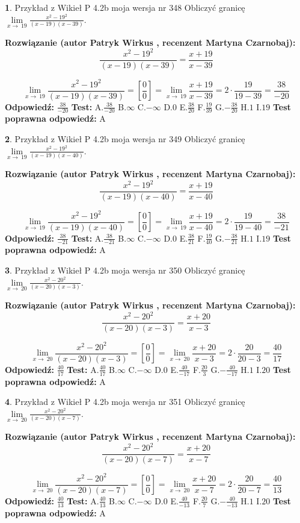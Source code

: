 \documentclass[12pt, a4paper]{article}
\theoremstyle{definition} %
\newtheorem{zad}{}
\newcommand{\zadStart}[1]{\begin{zad}#1\newline}
\newcommand{\zadStop}{\end{zad}}
\newcommand{\rozwStart}[2]{\noindent \textbf{Rozwiązanie (autor #1 , recenzent #2): }\newline}
\newcommand{\rozwStop}{\newline}
\newcommand{\odpStart}{\noindent \textbf{Odpowiedź:}\newline}
\newcommand{\odpStop}{\newline}
\newcommand{\testStart}{\noindent \textbf{Test:}\newline}
\newcommand{\testStop}{\newline}
\newcommand{\kluczStart}{\noindent \textbf{Test poprawna odpowiedź:}\newline}
\newcommand{\kluczStop}{\newline}
\begin{document}
\zadStart{Przykład z Wikieł P 4.2b moja wersja nr 348}
Obliczyć granicę $\lim\limits_{x\to\ 19}\frac{x^{2}-19^{2}}{(x-19)(x-39)}$.
\zadStop
\rozwStart{Patryk Wirkus}{Martyna Czarnobaj}
$$\frac{x^{2}-19^{2}}{(x-19)(x-39)}=\frac{x+19}{x-39}$$

$$\lim\limits_{x\to\ 19}\frac{x^{2}-19^{2}}{(x-19)(x-39)}=[\frac{0}{0}]=\lim\limits_{x\to\ 19}\frac{x+19}{x-39}=2 \cdot \frac{19}{19-39} = \frac{38}{-20}$$
\rozwStop
\odpStart
$\frac{38}{-20}$
\odpStop
\testStart
A.$\frac{38}{-20}$
B.$\infty$
C.$-\infty$
D.$0$
E.$\frac{38}{20}$
F.$\frac{19}{39}$
G.$-\frac{38}{20}$
H.$1$
I.$19$
\testStop
\kluczStart
A
\kluczStop



\zadStart{Przykład z Wikieł P 4.2b moja wersja nr 349}
Obliczyć granicę $\lim\limits_{x\to\ 19}\frac{x^{2}-19^{2}}{(x-19)(x-40)}$.
\zadStop
\rozwStart{Patryk Wirkus}{Martyna Czarnobaj}
$$\frac{x^{2}-19^{2}}{(x-19)(x-40)}=\frac{x+19}{x-40}$$

$$\lim\limits_{x\to\ 19}\frac{x^{2}-19^{2}}{(x-19)(x-40)}=[\frac{0}{0}]=\lim\limits_{x\to\ 19}\frac{x+19}{x-40}=2 \cdot \frac{19}{19-40} = \frac{38}{-21}$$
\rozwStop
\odpStart
$\frac{38}{-21}$
\odpStop
\testStart
A.$\frac{38}{-21}$
B.$\infty$
C.$-\infty$
D.$0$
E.$\frac{38}{21}$
F.$\frac{19}{40}$
G.$-\frac{38}{21}$
H.$1$
I.$19$
\testStop
\kluczStart
A
\kluczStop



\zadStart{Przykład z Wikieł P 4.2b moja wersja nr 350}
Obliczyć granicę $\lim\limits_{x\to\ 20}\frac{x^{2}-20^{2}}{(x-20)(x-3)}$.
\zadStop
\rozwStart{Patryk Wirkus}{Martyna Czarnobaj}
$$\frac{x^{2}-20^{2}}{(x-20)(x-3)}=\frac{x+20}{x-3}$$

$$\lim\limits_{x\to\ 20}\frac{x^{2}-20^{2}}{(x-20)(x-3)}=[\frac{0}{0}]=\lim\limits_{x\to\ 20}\frac{x+20}{x-3}=2 \cdot \frac{20}{20-3} = \frac{40}{17}$$
\rozwStop
\odpStart
$\frac{40}{17}$
\odpStop
\testStart
A.$\frac{40}{17}$
B.$\infty$
C.$-\infty$
D.$0$
E.$\frac{40}{-17}$
F.$\frac{20}{3}$
G.$-\frac{40}{-17}$
H.$1$
I.$20$
\testStop
\kluczStart
A
\kluczStop



\zadStart{Przykład z Wikieł P 4.2b moja wersja nr 351}
Obliczyć granicę $\lim\limits_{x\to\ 20}\frac{x^{2}-20^{2}}{(x-20)(x-7)}$.
\zadStop
\rozwStart{Patryk Wirkus}{Martyna Czarnobaj}
$$\frac{x^{2}-20^{2}}{(x-20)(x-7)}=\frac{x+20}{x-7}$$

$$\lim\limits_{x\to\ 20}\frac{x^{2}-20^{2}}{(x-20)(x-7)}=[\frac{0}{0}]=\lim\limits_{x\to\ 20}\frac{x+20}{x-7}=2 \cdot \frac{20}{20-7} = \frac{40}{13}$$
\rozwStop
\odpStart
$\frac{40}{13}$
\odpStop
\testStart
A.$\frac{40}{13}$
B.$\infty$
C.$-\infty$
D.$0$
E.$\frac{40}{-13}$
F.$\frac{20}{7}$
G.$-\frac{40}{-13}$
H.$1$
I.$20$
\testStop
\kluczStart
A
\kluczStop
\end{document}
